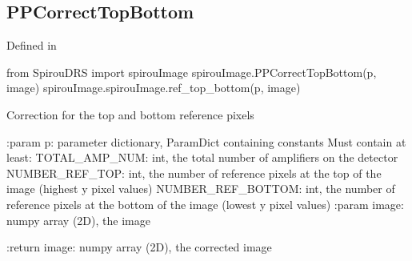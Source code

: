 \noindent\begin{minipage}{\textwidth}
\subsection{PPCorrectTopBottom}

Defined in \spirouImage{}

\begin{pythonbox}
from SpirouDRS import spirouImage
spirouImage.PPCorrectTopBottom(p, image)
spirouImage.spirouImage.ref_top_bottom(p, image)
\end{pythonbox}

\begin{pythondocstring}
Correction for the top and bottom reference pixels

:param p: parameter dictionary, ParamDict containing constants
        Must contain at least:
            TOTAL_AMP_NUM: int, the total number of amplifiers on the
                           detector
            NUMBER_REF_TOP: int, the number of reference pixels at the top
                            of the image (highest y pixel values)
            NUMBER_REF_BOTTOM: int, the number of reference pixels at the
                               bottom of the image (lowest y pixel values)
:param image: numpy array (2D), the image

:return image: numpy array (2D), the corrected image
\end{pythondocstring}
\end{minipage}


